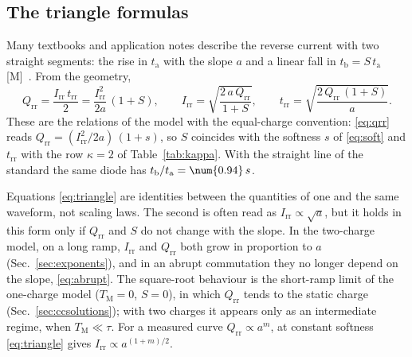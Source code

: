 \documentclass[10pt,a4paper]{scrartcl}
\newcommand{\Irr}{I_\mathrm{rr}}
\newcommand{\Qrr}{Q_\mathrm{rr}}
\newcommand{\trr}{t_\mathrm{rr}}
\newcommand{\ta}{t_\mathrm{a}}
\newcommand{\tb}{t_\mathrm{b}}
\newcommand{\TM}{T_\mathrm{M}}
\begin{document}
\subsection{The triangle formulas}
\label{sec:triangle}
Many textbooks and application notes describe the reverse current with two straight segments: the rise in $\ta$ with the slope $a$ and a linear fall in $\tb = S\,\ta$ [M]~\cite{mohan}. From the geometry,
\begin{equation}
\Qrr = \frac{\Irr\,\trr}{2} = \frac{\Irr^2}{2a}\,(1+S) , \qquad \Irr = \sqrt{\frac{2\,a\,\Qrr}{1+S}} , \qquad \trr = \sqrt{\frac{2\,\Qrr\,(1+S)}{a}} .
\label{eq:triangle}
\end{equation}
These are the relations of the model with the equal-charge convention: \eqref{eq:qrr} reads $\Qrr = (\Irr^2/2a)\,(1+s)$, so $S$ coincides with the softness $s$ of \eqref{eq:soft} and $\trr$ with the row $\kappa = 2$ of Table~\ref{tab:kappa}. With the straight line of the standard the same diode has $\tb/\ta = \num{\lmKLineHalf}\,s$.

Equations \eqref{eq:triangle} are identities between the quantities of one and the same waveform, not scaling laws. The second is often read as $\Irr \propto \sqrt{a}$, but it holds in this form only if $\Qrr$ and $S$ do not change with the slope. In the two-charge model, on a long ramp, $\Irr$ and $\Qrr$ both grow in proportion to $a$ (Sec.~\ref{sec:exponents}), and in an abrupt commutation they no longer depend on the slope, \eqref{eq:abrupt}. The square-root behaviour is the short-ramp limit of the one-charge model ($\TM = 0$, $S = 0$), in which $\Qrr$ tends to the static charge (Sec.~\ref{sec:ccsolutions}); with two charges it appears only as an intermediate regime, when $\TM \ll \tau$. For a measured curve $\Qrr \propto a^{m}$, at constant softness \eqref{eq:triangle} gives $\Irr \propto a^{(1+m)/2}$.
\end{document}
